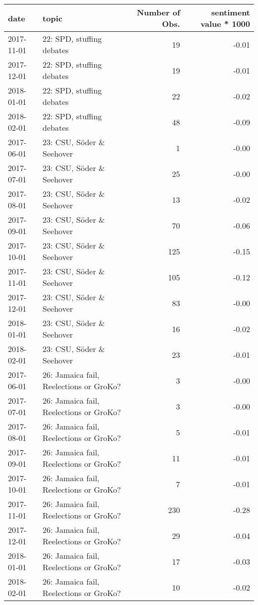 \begin{adjustbox}{width=\textwidth}
\begin{tabular}{llrr}
  \hline
date & topic & Number of Obs. & sentiment value * 1000 \\ 
  \hline
2017-11-01 & 22: SPD, stuffing debates &  19 & -0.01 \\ 
  2017-12-01 & 22: SPD, stuffing debates &  19 & -0.01 \\ 
  2018-01-01 & 22: SPD, stuffing debates &  22 & -0.02 \\ 
  2018-02-01 & 22: SPD, stuffing debates &  48 & -0.09 \\ 
  2017-06-01 & 23: CSU, Söder \& Seehover &   1 & -0.00 \\ 
  2017-07-01 & 23: CSU, Söder \& Seehover &  25 & -0.00 \\ 
  2017-08-01 & 23: CSU, Söder \& Seehover &  13 & -0.02 \\ 
  2017-09-01 & 23: CSU, Söder \& Seehover &  70 & -0.06 \\ 
  2017-10-01 & 23: CSU, Söder \& Seehover & 125 & -0.15 \\ 
  2017-11-01 & 23: CSU, Söder \& Seehover & 105 & -0.12 \\ 
  2017-12-01 & 23: CSU, Söder \& Seehover &  83 & -0.00 \\ 
  2018-01-01 & 23: CSU, Söder \& Seehover &  16 & -0.02 \\ 
  2018-02-01 & 23: CSU, Söder \& Seehover &  23 & -0.01 \\ 
  2017-06-01 & 26: Jamaica fail, Reelections or GroKo? &   3 & -0.00 \\ 
  2017-07-01 & 26: Jamaica fail, Reelections or GroKo? &   3 & -0.00 \\ 
  2017-08-01 & 26: Jamaica fail, Reelections or GroKo? &   5 & -0.01 \\ 
  2017-09-01 & 26: Jamaica fail, Reelections or GroKo? &  11 & -0.01 \\ 
  2017-10-01 & 26: Jamaica fail, Reelections or GroKo? &   7 & -0.01 \\ 
  2017-11-01 & 26: Jamaica fail, Reelections or GroKo? & 230 & -0.28 \\ 
  2017-12-01 & 26: Jamaica fail, Reelections or GroKo? &  29 & -0.04 \\ 
  2018-01-01 & 26: Jamaica fail, Reelections or GroKo? &  17 & -0.03 \\ 
  2018-02-01 & 26: Jamaica fail, Reelections or GroKo? &  10 & -0.02 \\ 

\end{tabular}
\end{adjustbox}
